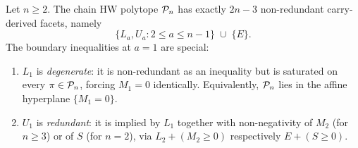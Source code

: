 \begin{theorem}\label{thm:carry-F}
Let $n \ge 2$. The chain HW polytope $\mathcal{P}_n$ has exactly $2n - 3$ non-redundant
carry-derived facets, namely
\[
   \{L_a, U_a : 2 \le a \le n-1\} \;\cup\; \{E\}.
\]
The boundary inequalities at $a = 1$ are special:
\begin{enumerate}[label=(\roman*),leftmargin=2em]
  \item $L_1$ is \emph{degenerate}: it is non-redundant as an inequality but is
    saturated on every $\pi \in \mathcal{P}_n$, forcing $M_1 = 0$ identically. Equivalently,
    $\mathcal{P}_n$ lies in the affine hyperplane $\{M_1 = 0\}$.
  \item $U_1$ is \emph{redundant}: it is implied by $L_1$ together with non-negativity
    of $M_2$ (for $n \ge 3$) or of $S$ (for $n = 2$), via $L_2 + (M_2 \ge 0)$
    respectively $E + (S \ge 0)$.
\end{enumerate}
\end{theorem}

